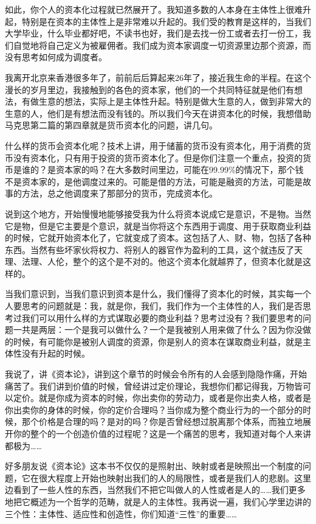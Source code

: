 \documentclass[UTF8, 12pt, a4paper]{ctexrep}
\begin{document}
如此，你个人的资本化过程就已然展开了。我知道多数的人本身在主体性上很难升起，特别是在资本的主体性上是非常难以升起的。我们受的教育是这样的，当我们大学毕业，什么毕业都好吧，不读书也好，我们是去找一份工或者去打一份工，我们自觉地将自己定义为被雇佣者。我们成为资本家调度一切资源里边那个资源，而没有思考如何成为调度者。

我离开北京来香港很多年了，前前后后算起来26年了，接近我生命的半程。在这个漫长的岁月里边，我接触到的各色的资本家，他们的一个共同特征就是他们有想法，有做生意的想法，实际上是主体性升起。特别是做大生意的人，做到非常大的生意的人，他们是有想法而没有钱的。所以我们今天在讲资本化的时候，我想借助马克思第二篇的第四章就是货币资本化的问题，讲几句。

什么样的货币会资本化呢？技术上讲，用于储蓄的货币没有资本化，用于消费的货币没有资本化，只有用于投资的货币资本化了。但是你们注意一个重点，投资的货币是谁的？是资本家的吗？在大多数时间里边，可能在99.99\%的情况下，那个钱不是资本家的，是他调度过来的。可能是借的方法，可能是融资的方法，可能是故事的方法，总之他调度来了那部分的货币，完成资本化。

说到这个地方，开始慢慢地能够接受我为什么将资本说成它是意识，不是物。当然它是物，但是它主要是个意识，就是当你将这个东西用于调度、用于获取商业利益的时候，它就开始资本化了，它就变成了资本。这包括了人、财、物，包括了各种东西。当然有些坏家伙将权力、将别人的器官作为盈利的工具，这个就违反了天理、法理、人伦，整个的这个是不对的。他这个资本化就越界了，但资本化就是这样的。

当我们意识到，当我们意识到资本是什么，我们懂得了资本化的时候，其实每一个人要思考的问题就是：我，就是你，我们，我们作为一个主体性的人，我们是否思考过我们可以用什么样的方式谋取必要的商业利益？思考过没有？我们要思考的问题一共是两层：一个是我可以做什么？一个是我被别人用来做了什么？因为你没做的时候，有可能你是被别人调度的资源，你是别人的资本在谋取商业利益，就是主体性没有升起的时候。

我说了，讲《资本论》，讲到这个章节的时候会令所有的人会感到隐隐作痛，开始痛苦了。我们讲到价值的时候，曾经讲过定价理论，我想你们都记得我，万物皆可以定价。就是你成为资本的时候，你出卖你的劳动力，或者是你出卖人格，或者是你出卖你的身体的时候，你的定价合理吗？当你成为整个商业行为的一个部分的时候，那个价格是合理的吗？是对的吗？你是否曾经想过脱离那个体系，而独立地展开你的整个的一个创造价值的过程呢？这是一个痛苦的思考，我知道对每个人来讲都极为……

好多朋友说《资本论》这本书不仅仅的是照射出、映射或者是映照出一个制度的问题，它在很大程度上开始也映射出我们的人的局限性，或者是我们人的悲剧。这里边看到了一些人性的东西，当然我们不把它叫做人的人性或者是人的……我们更多地把它概述为一个哲学的范畴，就是人的主体性。我再说一遍，我们心学里边讲的三个性：主体性、适应性和创造性，你们知道“三性”的重要……
\end{document}
